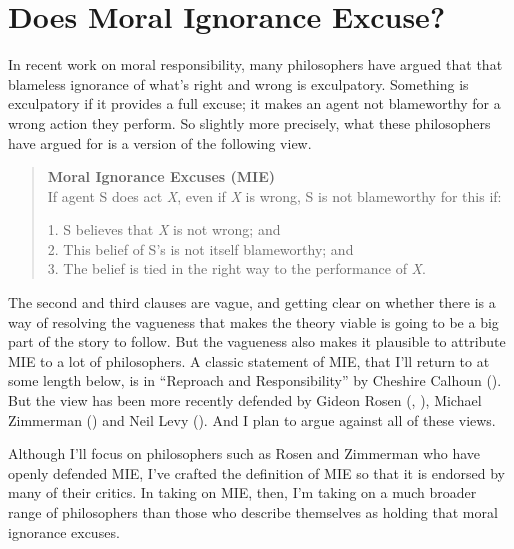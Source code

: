\documentclass[
  10pt,
  letterpaper,
  twoside]{scrbook}
\begin{document}
\section{Does Moral Ignorance Excuse?}\label{doesmoralignoranceexcuse}

In recent work on moral responsibility, many philosophers have argued
that that blameless ignorance of what's right and wrong is exculpatory.
Something is exculpatory if it provides a full excuse; it makes an agent
not blameworthy for a wrong action they perform. So slightly more
precisely, what these philosophers have argued for is a version of the
following view.

\begin{quote}
\textbf{Moral Ignorance Excuses (MIE)}\\
If agent S does act \emph{X}, even if \emph{X} is wrong, S is not
blameworthy for this if:

1. S believes that \emph{X} is not wrong; and\\
2. This belief of S's is not itself blameworthy; and\\
3. The belief is tied in the right way to the performance of \emph{X}.
\end{quote}

The second and third clauses are vague, and getting clear on whether
there is a way of resolving the vagueness that makes the theory viable
is going to be a big part of the story to follow. But the vagueness also
makes it plausible to attribute MIE to a lot of philosophers. A classic
statement of MIE, that I'll return to at some length below, is in
``Reproach and Responsibility'' by Cheshire Calhoun
(). But the view has been more recently
defended by Gideon Rosen (,
), Michael Zimmerman
() and Neil Levy
(). And I plan to argue against all of
these views.

Although I'll focus on philosophers such as Rosen and Zimmerman who have
openly defended MIE, I've crafted the definition of MIE so that it is
endorsed by many of their critics. In taking on MIE, then, I'm taking on
a much broader range of philosophers than those who describe themselves
as holding that moral ignorance excuses.
\end{document}
